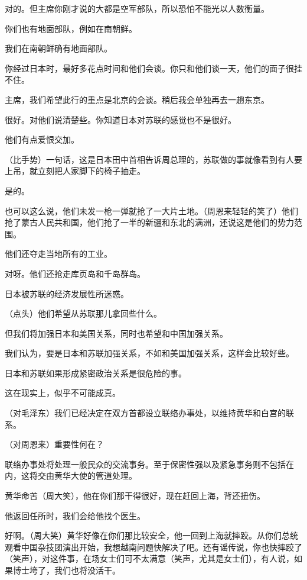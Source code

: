 对的。但主席你刚才说的大都是空军部队，所以恐怕不能光以人数衡量。

你们也有地面部队，例如在南朝鲜。

我们在南朝鲜确有地面部队。

你经过日本时，最好多花点时间和他们会谈。你只和他们谈一天，他们的面子很挂不住。

主席，我们希望此行的重点是北京的会谈。稍后我会单独再去一趟东京。

很好。对他们说清楚些。你知道日本对苏联的感觉也不是很好。

他们有点爱恨交加。

（比手势）一句话，这是日本田中首相告诉周总理的，苏联做的事就像看到有人要上吊，就立刻把人家脚下的椅子抽走。

是的。

也可以这么说，他们未发一枪一弹就抢了一大片土地。（周恩来轻轻的笑了）他们抢了蒙古人民共和国，他们抢了一半的新疆和东北的满洲，还说这是他们的势力范围。

他们还夺走当地所有的工业。

对呀。他们还抢走库页岛和千岛群岛。

日本被苏联的经济发展性所迷惑。

（点头）他们希望从苏联那儿拿回些什么。

但我们将加强日本和美国关系，同时也希望和中国加强关系。

我们认为，要是日本和苏联加强关系，不如和美国加强关系，这样会比较好些。

日本和苏联如果形成紧密政治关系是很危险的事。

这在现实上，似乎不可能成真。

（对毛泽东）我们已经决定在双方首都设立联络办事处，以维持黄华和白宫的联系。

（对周恩来）重要性何在？

联络办事处将处理一般民众的交流事务。至于保密性强以及紧急事务则不包括在内，这将交由黄华大使的管道处理。

黄华命苦（周大笑），他在你们那干得很好，现在赶回上海，背还扭伤。

他返回任所时，我们会给他找个医生。

好啊。（周大笑）黄华好像在你们那比较安全，他一回到上海就摔跤。从你们总统观看中国杂技团演出开始，我想越南问题快解决了吧。还有谣传说，你也快摔跤了（笑声），对这件事，在场女士们可不太满意（笑声，尤其是女士们），有人说，如果博士垮了，我们也将没活干。

